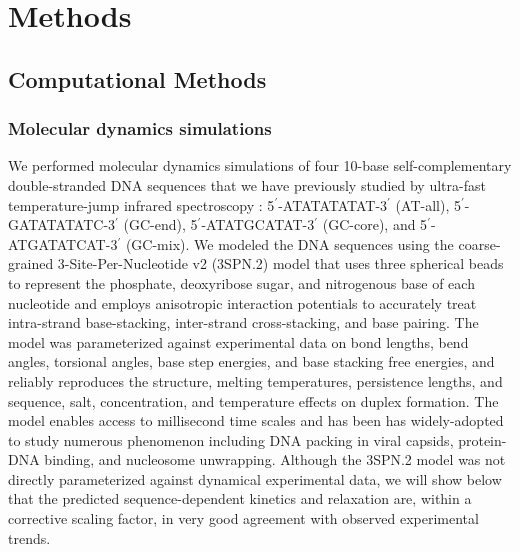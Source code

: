 \documentclass[journal=jpcbfk,manuscript=article]{achemso}
\begin{document}
\section{\label{sec:methods}Methods}

\subsection{Computational Methods}

\subsubsection{Molecular dynamics simulations}

We performed molecular dynamics simulations of four 10-base self-complementary double-stranded DNA sequences that we have previously studied by ultra-fast temperature-jump infrared spectroscopy \citep{Sanstead2016}: 5$^\prime$-ATATATATAT-3$^\prime$ (AT-all), 5$^\prime$-GATATATATC-3$^\prime$ (GC-end), 5$^\prime$-ATATGCATAT-3$^\prime$ (GC-core), and  5$^\prime$-ATGATATCAT-3$^\prime$ (GC-mix). We modeled the DNA sequences using the coarse-grained 3-Site-Per-Nucleotide v2 (3SPN.2) model that uses three spherical beads to represent the phosphate, deoxyribose sugar, and nitrogenous base of each nucleotide and employs anisotropic interaction potentials to accurately treat intra-strand base-stacking, inter-strand cross-stacking, and base pairing. \citep{Hinckley2013AnHybridization} The model was parameterized against experimental data on bond lengths, bend angles, torsional angles, base step energies, and base stacking free energies, and reliably reproduces the structure, melting temperatures, persistence lengths, and sequence, salt, concentration, and temperature effects on duplex formation. \citep{Hinckley2013AnHybridization} The model enables access to millisecond time scales and has been has widely-adopted to study numerous phenomenon including DNA packing in viral capsids, protein-DNA binding, and nucleosome unwrapping.\citep{Cordoba2017AIons, Lu2020OpenAWSEMSummary, Lequieu2016Tension-dependentUnwrapping} Although the 3SPN.2 model was not directly parameterized against dynamical experimental data, we will show below that the predicted sequence-dependent kinetics and relaxation are, within a corrective scaling factor, in very good agreement with observed experimental trends.
\end{document}
